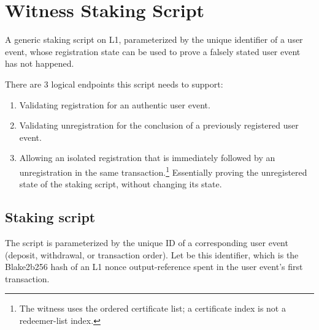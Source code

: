 \documentclass[../midgard.tex]{subfiles}
\begin{document}
\section{Witness Staking Script}
\label{h:witness}

A generic staking script on L1, parameterized by the unique identifier of a user event, whose registration state can be used to prove a falsely stated user event has not happened.

There are 3 logical endpoints this script needs to support:
\begin{enumerate}
    \item Validating registration for an authentic user event.
    \item Validating unregistration for the conclusion of a previously registered user event.
    \item Allowing an isolated registration that is immediately followed by an unregistration in the same transaction.\footnote{The witness uses the ordered certificate list; a certificate index is not a redeemer-list index.}
      Essentially proving the unregistered state of the staking script, without changing its state.
\end{enumerate}

\subsection{Staking script}
\label{h:witness-staking-script}
The  script is parameterized by the unique ID of a corresponding user event (deposit, withdrawal, or transaction order).
Let  be this identifier, which is the Blake2b256 hash of an L1 nonce output-reference spent in the user event's first transaction.
\end{document}
